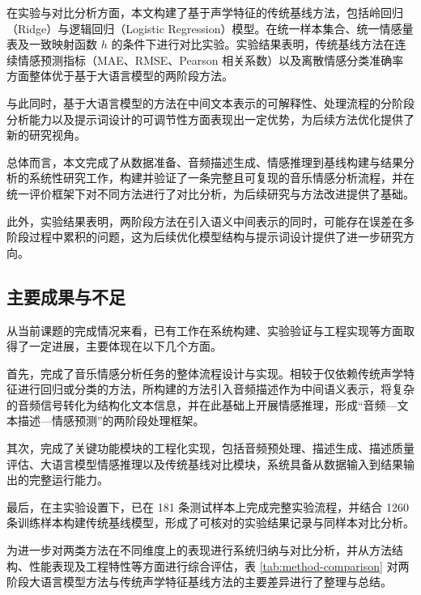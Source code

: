 在实验与对比分析方面，本文构建了基于声学特征的传统基线方法，包括岭回归（Ridge）与逻辑回归（Logistic Regression）模型。在统一样本集合、统一情感量表及一致映射函数 $h$ 的条件下进行对比实验。实验结果表明，传统基线方法在连续情感预测指标（MAE、RMSE、Pearson 相关系数）以及离散情感分类准确率方面整体优于基于大语言模型的两阶段方法。

与此同时，基于大语言模型的方法在中间文本表示的可解释性、处理流程的分阶段分析能力以及提示词设计的可调节性方面表现出一定优势，为后续方法优化提供了新的研究视角。

总体而言，本文完成了从数据准备、音频描述生成、情感推理到基线构建与结果分析的系统性研究工作，构建并验证了一条完整且可复现的音乐情感分析流程，并在统一评价框架下对不同方法进行了对比分析，为后续研究与方法改进提供了基础。

此外，实验结果表明，两阶段方法在引入语义中间表示的同时，可能存在误差在多阶段过程中累积的问题，这为后续优化模型结构与提示词设计提供了进一步研究方向。

\subsection{主要成果与不足}
从当前课题的完成情况来看，已有工作在系统构建、实验验证与工程实现等方面取得了一定进展，主要体现在以下几个方面。

首先，完成了音乐情感分析任务的整体流程设计与实现。相较于仅依赖传统声学特征进行回归或分类的方法，所构建的方法引入音频描述作为中间语义表示，将复杂的音频信号转化为结构化文本信息，并在此基础上开展情感推理，形成“音频—文本描述—情感预测”的两阶段处理框架。

其次，完成了关键功能模块的工程化实现，包括音频预处理、描述生成、描述质量评估、大语言模型情感推理以及传统基线对比模块，系统具备从数据输入到结果输出的完整运行能力。

最后，在主实验设置下，已在 181 条测试样本上完成完整实验流程，并结合 1260 条训练样本构建传统基线模型，形成了可核对的实验结果记录与同样本对比分析。

为进一步对两类方法在不同维度上的表现进行系统归纳与对比分析，并从方法结构、性能表现及工程特性等方面进行综合评估，表 \ref{tab:method-comparison} 对两阶段大语言模型方法与传统声学特征基线方法的主要差异进行了整理与总结。

